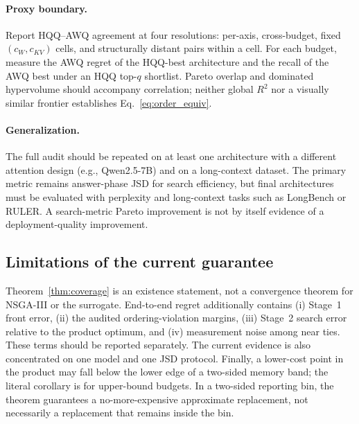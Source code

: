 \paragraph{Proxy boundary.}
Report HQQ--AWQ agreement at four resolutions: per-axis, cross-budget, fixed
$(c_W,c_{KV})$ cells, and structurally distant pairs within a cell.  For each
budget, measure the AWQ regret of the HQQ-best architecture and the recall of the
AWQ best under an HQQ top-$q$ shortlist.  Pareto overlap and dominated
hypervolume should accompany correlation; neither global $R^2$ nor a visually
similar frontier establishes Eq.~\eqref{eq:order_equiv}.

\paragraph{Generalization.}
The full audit should be repeated on at least one architecture with a different
attention design (e.g., Qwen2.5-7B) and on a long-context dataset.  The primary
metric remains answer-phase JSD for search efficiency, but final architectures
must be evaluated with perplexity and long-context tasks such as LongBench or
RULER.  A search-metric Pareto improvement is not by itself evidence of a
deployment-quality improvement.

\subsection{Limitations of the current guarantee}
\label{sec:limitations}

Theorem~\ref{thm:coverage} is an existence statement, not a convergence theorem
for NSGA-III or the surrogate.  End-to-end regret additionally contains (i)
Stage~1 front error, (ii) the audited ordering-violation margins, (iii) Stage~2
search error relative to the product optimum, and (iv) measurement noise among
near ties.  These terms should be reported separately.  The current evidence is
also concentrated on one model and one JSD protocol.  Finally, a lower-cost
point in the product may fall below the lower edge of a two-sided memory band;
the literal corollary is for upper-bound budgets.  In a two-sided reporting bin,
the theorem guarantees a no-more-expensive approximate replacement, not
necessarily a replacement that remains inside the bin.
